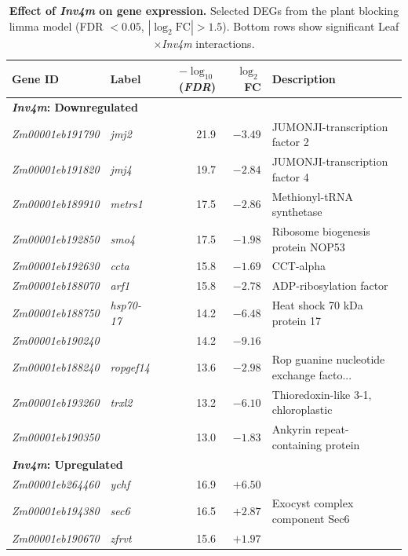 \documentclass[9pt,twocolumn,twoside]{rilabRxiv}
\newcommand{\invfour}{\textit{Inv4m}\xspace}
\begin{document}
\clearpage



\begin{table}[!ht]
\caption{\textbf{Effect of \invfour on gene expression.} Selected DEGs from the plant blocking limma model (FDR $< 0.05$, $|\log_2 \text{FC}| > 1.5$). Bottom rows show significant Leaf$\times$\invfour interactions.}
\label{tab:gene_effects}
\centering
\small
\begin{tabular}{@{}llrrl@{}}
\toprule
\textbf{Gene ID} & \textbf{Label} & \textbf{$-\log_{10}$(\textit{FDR})} & \textbf{$\log_2$FC} & \textbf{Description} \\ \midrule
\multicolumn{5}{l}{\textbf{\invfour: Downregulated}} \\ \midrule
\textit{Zm00001eb191790} & \textit{jmj2} & 21.9 & $-3.49$ & JUMONJI-transcription factor 2 \\
\textit{Zm00001eb191820} & \textit{jmj4} & 19.7 & $-2.84$ & JUMONJI-transcription factor 4 \\
\textit{Zm00001eb189910} & \textit{metrs1} & 17.5 & $-2.86$ & Methionyl-tRNA synthetase \\
\textit{Zm00001eb192850} & \textit{smo4} & 17.5 & $-1.98$ & Ribosome biogenesis protein NOP53 \\
\textit{Zm00001eb192630} & \textit{ccta} & 15.8 & $-1.69$ & CCT-alpha \\
\textit{Zm00001eb188070} & \textit{arf1} & 15.8 & $-2.78$ & ADP-ribosylation factor \\
\textit{Zm00001eb188750} & \textit{hsp70-17} & 14.2 & $-6.48$ & Heat shock 70 kDa protein 17 \\
\textit{Zm00001eb190240} &  & 14.2 & $-9.16$ &  \\
\textit{Zm00001eb188240} & \textit{ropgef14} & 13.6 & $-2.98$ & Rop guanine nucleotide exchange facto... \\
\textit{Zm00001eb193260} & \textit{trxl2} & 13.2 & $-6.10$ & Thioredoxin-like 3-1, chloroplastic \\
\textit{Zm00001eb190350} &  & 13.0 & $-1.83$ & Ankyrin repeat-containing protein \\
\midrule
\multicolumn{5}{l}{\textbf{\invfour: Upregulated}} \\ \midrule
\textit{Zm00001eb264460} & \textit{ychf} & 16.9 & $+6.50$ &  \\
\textit{Zm00001eb194380} & \textit{sec6} & 16.5 & $+2.87$ & Exocyst complex component Sec6 \\
\textit{Zm00001eb190670} & \textit{zfrvt} & 15.6 & $+1.97$ &  \\

\end{tabular}
\end{table}
\end{document}
